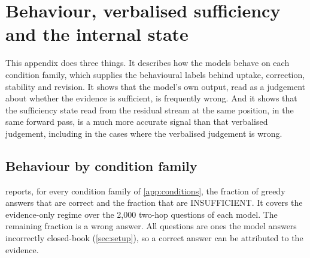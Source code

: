 \section{Behaviour, verbalised sufficiency and the internal state}
\label{app:behaviour}

This appendix does three things. It describes how the models behave on each condition family, which supplies the behavioural labels behind uptake, correction, stability and revision. It shows that the model's own output, read as a judgement about whether the evidence is sufficient, is frequently wrong. And it shows that the sufficiency state read from the residual stream at the same position, in the same forward pass, is a much more accurate signal than that verbalised judgement, including in the cases where the verbalised judgement is wrong.

\subsection{Behaviour by condition family}

 reports, for every condition family of \cref{app:conditions}, the fraction of greedy answers that are correct and the fraction that are INSUFFICIENT. It covers the evidence-only regime over the 2{,}000 two-hop questions of each model. The remaining fraction is a wrong answer. All questions are ones the model answers incorrectly closed-book (\cref{sec:setup}), so a correct answer can be attributed to the evidence.

\begin{table}[t]
\centering\small

\caption{Behaviour by condition family (evidence-only regime, 2{,}000 questions per model): fraction correct / fraction answering INSUFFICIENT. The remaining fraction is a wrong answer.}
\label{tab:behaviour}
\end{table}


